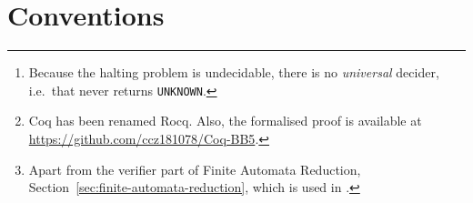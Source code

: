\documentclass[a4paper,british]{article}
\theoremstyle{definition} %
\numberwithin{equation}{section}
\theoremstyle{definition} %
\begin{document}
\date{}

\maketitle
\vspace{-3.7em}
\begin{abstract}
  The Busy Beaver Challenge (or bbchallenge) aims at collaboratively solving the following conjecture: ``$S(5) = 47{,}176{,}870$'' [Radó, 1962]\nocite{Rado_1962}, [Marxen and Buntrock, 1990]\nocite{Marxen_1990}, [Aaronson, 2020]\nocite{BusyBeaverFrontier}. This conjecture says that if a 5-state Turing machine runs for more than 47,176,870 steps without halting, then it will never halt -- starting from the all-0 tape. Proving this conjecture amounts to deciding whether 181,385,789  Turing machines with 5 states halt or not -- starting from the all-0 tape \cite{bbchallenge2025}. To do so, we write \textit{deciders}: programs that take as input a Turing machine and output either \texttt{HALT}, \texttt{NONHALT}, or \texttt{UNKNOWN}. Each decider is specialised in recognising a particular type of non-halting behavior.\footnote{Because the halting problem is undecidable, there is no \textit{universal} decider, i.e.~that never returns \texttt{UNKNOWN}.}

  After two years of work, the Busy Beaver Challenge achieved its goal in July 2024 by delivering a proof of ``$S(5) = 47{,}176{,}870$'' formalised in Coq\footnote{Coq has been renamed Rocq. Also, the formalised proof is available at \url{https://github.com/ccz181078/Coq-BB5}.} \cite{bbchallenge2025}. In this document, we present deciders that were developed before the Coq proof and which \textbf{were not used} in the proof;\footnote{Apart from the verifier part of Finite Automata Reduction, Section~\ref{sec:finite-automata-reduction}, which is used in \cite{bbchallenge2025}.} nonetheless, they are relevant techniques for analysing Turing machines. Part II of this work is the decider section of our paper showing ``$S(5) = 47{,}176{,}870$'' \cite{bbchallenge2025}, presenting the deciders that were used in the Coq proof.

\end{abstract}

\setcounter{tocdepth}{2}
\tableofcontents

\newpage
\section{Conventions}\label{sec:conventions}
\end{document}
